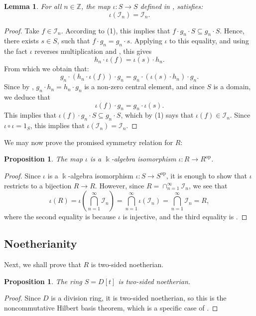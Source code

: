 \documentclass{amsart}
\newtheorem{prop}[equation]{Proposition}
\newtheorem{lem}[equation]{Lemma}
\theoremstyle{definition}
\newcommand{\opn}{\operatorname}
\renewcommand{\k}{\Bbbk}
\numberwithin{equation}{section}
\begin{document}
\begin{lem}\label{lem:iotaIn}
For all $n\in \mathbb{Z}$,
the map $\iota:S \to S$ defined in ,
satisfies:
\[
\iota(\mathcal{I}_n) = \mathcal{I}_n.
\]
\end{lem}
\begin{proof}
Take $f \in \mathcal{I}_n$.
According to (1),
this implies that $f \cdot g_n \cdot S \subseteq g_n \cdot S$.
Hence, there exists $s \in S$,
such that $f\cdot g_n = g_n \cdot s$.
Applying $\iota$ to this equality, 
and using the fact $\iota$ reverses multiplication and , this gives
\[
h_n \cdot \iota(f) = \iota(s) \cdot h_n.
\]
From which we obtain that:
\[
g_n \cdot (h_n \cdot \iota(f)) \cdot g_n = g_n \cdot (\iota(s) \cdot h_n) \cdot g_n.
\]
Since by , $g_n\cdot h_n = h_n\cdot g_n$ is a non-zero central element, and since $S$ is a domain,
we deduce that
\[
\iota(f) \cdot g_n = g_n \cdot \iota(s).
\]
This implies that $\iota(f) \cdot g_n \cdot S \subseteq g_n \cdot S$,
which by (1) says that $\iota(f) \in \mathcal{I}_n$.
Since $\iota\circ \iota = 1_S$, this implies that $\iota(\mathcal{I}_n) = \mathcal{I}_n$.
\end{proof}

We may now prove the promised symmetry relation for $R$:
\begin{prop}\label{prop:symmetry}
The map $\iota$ is a $\k$-algebra isomorphism $\iota:R \to R^{\opn{op}}$.    
\end{prop}
\begin{proof}
Since $\iota$ is a $\k$-algebra isomorphism $\iota:S \to S^{\opn{op}}$,
it is enough to show that $\iota$ restricts to a bijection $R\to R$.
However, since $R = \cap_{n=1}^{\infty} \mathcal{I}_n$,
we see that
\[
\iota(R) = \iota(\bigcap_{n=1}^{\infty} \mathcal{I}_n) =
\bigcap_{n=1}^{\infty} \iota(\mathcal{I}_n) =
\bigcap_{n=1}^{\infty} \mathcal{I}_n = R,
\]
where the second equality is because $\iota$ is injective, 
and the third equality is .
\end{proof}

\subsection{Noetherianity}

Next, we shall prove that $R$ is two-sided noetherian.

\begin{prop}\label{prop:sNoetherian}
The ring $S = D[t]$ is two-sided noetherian.    
\end{prop}
\begin{proof}
Since $D$ is a division ring,
it is two-sided noetherian, so
this is the noncommutative Hilbert basis theorem,
which is a specific case of \cite[Theorem 1.2.9(iv)]{NCBook}.
\end{proof}
\end{document}
